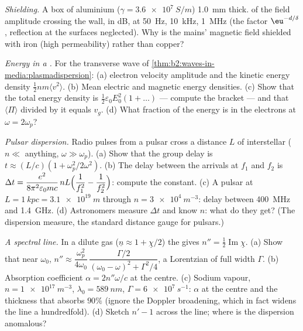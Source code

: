 \begin{exercise}[$\star\star$]\label{exo:b2:waves-in-media:6}
\emph{Shielding.} A box of aluminium ($\gamma = \qty{3.6e7}{S/m}$) \qty{1.0}{mm}
thick.  of the field amplitude crossing the wall, in dB, at
\qty{50}{Hz}, \qty{10}{kHz}, \qty{1}{MHz} (the factor $\eu^{-d/\delta}$, reflection at
the surfaces neglected). Why is the mains' magnetic field shielded
with iron (high permeability) rather than copper?
\end{exercise}

\begin{exercise}[$\star\star$]\label{exo:b2:waves-in-media:7}
\emph{Energy in a .} For the transverse wave of
\cref{thm:b2:waves-in-media:plasmadispersion}: (a) electron velocity
amplitude and the kinetic energy density $\tfrac12nm\langle v^2\rangle$. (b)
Mean electric and magnetic energy densities. (c) Show that the total
energy density is $\tfrac12\varepsilon_0E_0^2(1 + \dots)$ --- compute the bracket ---
and that $\langle\Pi\rangle$ divided by it equals $v_g$. (d) What fraction of
the energy is in the electrons at $\omega = 2\omega_p$?
\end{exercise}

\begin{exercise}[$\star\star$]\label{exo:b2:waves-in-media:8}
\emph{Pulsar dispersion.} Radio pulses from a pulsar cross a distance
$L$ of interstellar  ($n \ll$ anything, $\omega \gg \omega_p$). (a) Show
that the group delay is $t \approx (L/c)(1 + \omega_p^2/2\omega^2)$. (b) The delay
between the arrivals at $f_1$ and $f_2$ is $\Delta t = \dfrac{e^2}{8\pi^2
\varepsilon_0mc}\,nL\Bigl(\dfrac1{f_1^2} - \dfrac1{f_2^2}\Bigr)$: compute the constant.
(c) A pulsar at $L = \qty{1}{kpc} = \qty{3.1e19}{m}$ through $n = \qty{3e4}{m^{-3}}$:
delay between \qty{400}{MHz} and \qty{1.4}{GHz}. (d) Astronomers measure
$\Delta t$ and know $n$: what do they get? (The dispersion measure, the
standard distance gauge for pulsars.)
\end{exercise}

\begin{exercise}[$\star\star$]\label{exo:b2:waves-in-media:9}
\emph{A spectral line.} In a dilute gas ($\underline n \approx 1 + \underline\chi/2$) the
 gives $n'' = \tfrac12\operatorname{Im}\underline\chi$. (a) Show that near
$\omega_0$, $n'' \approx \dfrac{\omega_p^2}{4\omega_0}\,\dfrac{\Gamma/2}{(\omega_0 - \omega)^2 + \Gamma^2/4}$, a
Lorentzian of full width $\Gamma$. (b) Absorption coefficient $\alpha = 2n''\omega/c$
at the centre. (c) Sodium vapour, $n = \qty{1e17}{m^{-3}}$, $\lambda_0 = \qty{589}{nm}$,
$\Gamma = \qty{6e7}{s^{-1}}$: $\alpha$ at the centre and the thickness that absorbs
$90\%$ (ignore the Doppler broadening, which in fact widens the line a
hundredfold). (d) Sketch $n' - 1$ across the line; where is the
dispersion anomalous?
\end{exercise}


